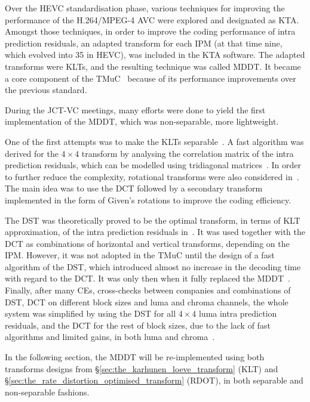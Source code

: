 \documentclass[11pt,a4paper,openright,twoside]{book}
\numberwithin{equation}{section} %
\numberwithin{figure}{section} %
\numberwithin{table}{section} %
\begin{document}
Over the \ac{HEVC} standardisation phase, various techniques for
improving the performance of the H.264/\acs{MPEG}-4 \acs{AVC} were
explored and designated as \ac{KTA}.
Amongst those techniques, in order to improve the coding performance of
intra prediction residuals, an adapted transform for each \ac{IPM} (at
that time nine, which evolved into 35 in \ac{HEVC}), was included in the
\ac{KTA} software.
The adapted transforms were \acp{KLT}, and the resulting technique was
called \ac{MDDT}.
It became a core component of the \ac{TMuC}~\cite{JCTVC-A204} because of
its performance improvements over the previous standard.

During the \ac{JCT-VC} meetings, many efforts were done to yield the
first implementation of the \ac{MDDT}, which was non-separable, more
lightweight.

One of the first attempts was to make the \acp{KLT}
separable~\cite{JCTVC-B024}.
A fast algorithm was derived for the $4\times4$ transform by analysing
the correlation matrix of the intra prediction residuals, which can be
modelled using tridiagonal
matrices~\cite{yueh-05-eigenvalues-tridiagonal}.
In order to further reduce the complexity, rotational transforms were
also considered in~\cite{JCTVC-C096}.
The main idea was to use the \ac{DCT} followed by a secondary transform
implemented in the form of Given's rotations to improve the coding
efficiency.

The \ac{DST} was theoretically proved to be the optimal transform, in
terms of \ac{KLT} approximation, of the intra prediction residuals
in~\cite{JCTVC-C108, JCTVC-D033}.
It was used together with the \ac{DCT} as combinations of horizontal and
vertical transforms, depending on the \ac{IPM}.
However, it was not adopted in the \ac{TMuC} until the design of a fast
algorithm of the \ac{DST}, which introduced almost no increase in the
decoding time with regard to the \ac{DCT}.
It was only then when it fully replaced the \ac{MDDT}~\cite{JCTVC-D048,
JCTVC-E125, JCTVC-F283, JCTVC-G108}.
Finally, after many \acp{CE}, cross-checks between companies and
combinations of \ac{DST}, \ac{DCT} on different block sizes and luma and
chroma channels, the whole system was simplified by using the \ac{DST}
for all $4\times4$ luma intra prediction residuals, and the \ac{DCT} for
the rest of block sizes, due to the lack of fast algorithms and limited
gains, in both luma and chroma~\cite{JCTVC-J0021}.

In the following section, the \ac{MDDT} will be re-implemented using
both transforms designs from \S\ref{sec:the_karhunen_loeve_transform}
(\ac{KLT}) and \S\ref{sec:the_rate_distortion_optimised_transform}
(\ac{RDOT}), in both separable and non-separable fashions.
\end{document}
